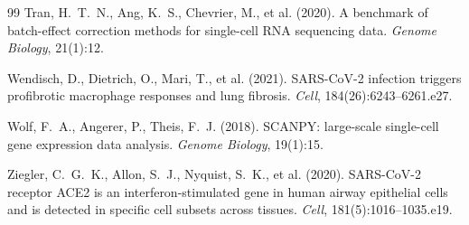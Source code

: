 \documentclass[11pt]{article}
\begin{document}
\begin{thebibliography}{99}
Tran, H.~T.~N., Ang, K.~S., Chevrier, M., et al. (2020).
A benchmark of batch-effect correction methods for single-cell RNA sequencing data.
\textit{Genome Biology}, 21(1):12.

Wendisch, D., Dietrich, O., Mari, T., et al. (2021).
SARS-CoV-2 infection triggers profibrotic macrophage responses and lung fibrosis.
\textit{Cell}, 184(26):6243--6261.e27.

Wolf, F.~A., Angerer, P., Theis, F.~J. (2018).
SCANPY: large-scale single-cell gene expression data analysis.
\textit{Genome Biology}, 19(1):15.

Ziegler, C.~G.~K., Allon, S.~J., Nyquist, S.~K., et al. (2020).
SARS-CoV-2 receptor ACE2 is an interferon-stimulated gene in human airway epithelial cells and is detected in specific cell subsets across tissues.
\textit{Cell}, 181(5):1016--1035.e19.

\end{thebibliography}
\end{document}
